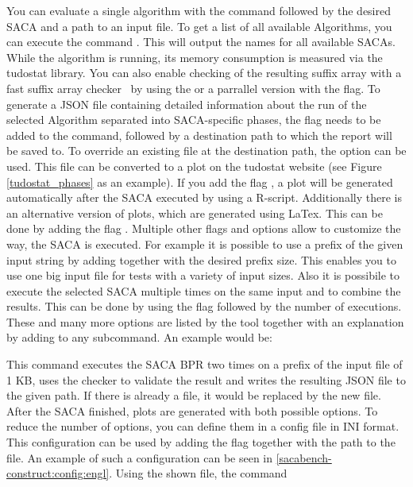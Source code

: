 You can evaluate a single algorithm with the command  followed by the desired SACA and a path to an input file.
To get a list of all available Algorithms, you can execute the command .
This will output the names for all available SACAs.
While the algorithm is running, its memory consumption is measured via the tudostat library.
You can also enable checking of the resulting suffix array with a fast suffix array checker~\cite{saca:11} by
using the  or a parrallel version with the  flag.
To generate a JSON file containing detailed information about the run of the selected Algorithm separated into SACA-specific phases,
the flag  needs to be added to the command, followed by a destination path to which the report will be saved to.
To override an existing file at the destination path, the option  can be used.
This file can be converted to a plot on the tudostat website (see Figure \ref{tudostat_phases} as an example).
If you add the flag , a plot will be generated automatically after the SACA executed by using a R-script.
Additionally there is an alternative version of plots, which are generated using LaTex.
This can be done by adding the flag .
Multiple other flags and options allow to customize the way, the SACA is executed.
For example it is possible to use a prefix of the given input string by adding  together with the desired prefix size. 
This enables you to use one big input file for tests with a variety of input sizes.
Also it is possibile to execute the selected SACA multiple times on the same input and to combine the results.
This can be done by using the flag  followed by the number of executions.
These and many more options are listed by the tool together with an explanation by adding  to any subcommand.
An example would be:


This command executes the SACA BPR two times on a prefix of the input file of 1 KB, 
uses the checker to validate the result and writes the resulting JSON file to the given path.
If there is already a file, it would be replaced by the new file.
After the SACA finished, plots are generated with both possible options.
To reduce the number of options, you can define them in a config file in INI format.
This configuration can be used by adding the flag  together with the path to the file.
An example of such a configuration can be seen in \ref{sacabench-construct:config:engl}.
Using the shown file, the command 

